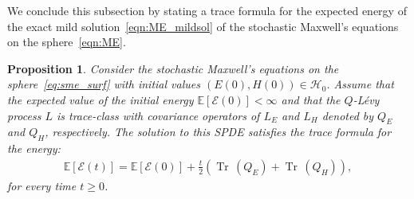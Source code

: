 \documentclass[11pt]{amsart}
\newtheorem{proposition}[theorem]{Proposition}
\newcommand{\E}{{\mathbb E}}
\newcommand{\tr}{{\operatorname{Tr}\, }}
\begin{document}
We conclude this subsection by stating a trace formula for the expected energy of the exact mild solution~\eqref{eqn:ME_mildsol}
of the stochastic Maxwell's equations on the sphere~\eqref{eqn:ME}.
\begin{proposition}\label{prop:energy-exact_max}
	Consider the stochastic Maxwell's equations on the sphere~\eqref{eq:sme_surf} with initial values $(E(0),H(0))\in \mathcal{H}_0$.
	Assume that the expected value of the initial energy $\E\left[\mathcal{E}(0)\right]<\infty$ and that the $Q$-L\'evy process $L$
	is trace-class with covariance operators of $L_E$ and $L_H$ denoted by $Q_E$ and $Q_H$, respectively.
	The solution to this SPDE satisfies the trace formula for the energy:
	\begin{align*}
		\E\left[\mathcal{E}(t)\right]=\E\left[\mathcal{E}(0)\right]+\frac{t}2\left(\tr(Q_E)+\tr(Q_H)\right),
	\end{align*}
	for every time $t\geq0$.
\end{proposition}
\end{document}
